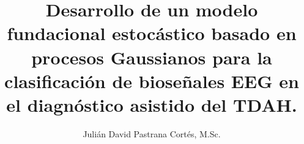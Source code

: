 \usepackage[es-tabla]{babel}
\usepackage{parskip}
\usepackage[capitalise, noabbrev]{cleveref}



\title{
	\textbf{
		Desarrollo de un modelo fundacional estocástico basado en procesos Gaussianos para la clasificación de bioseñales EEG en el diagnóstico asistido del TDAH.
	}
	}
\author{
	Julián David Pastrana Cortés, M.Sc.
	}


\date{}